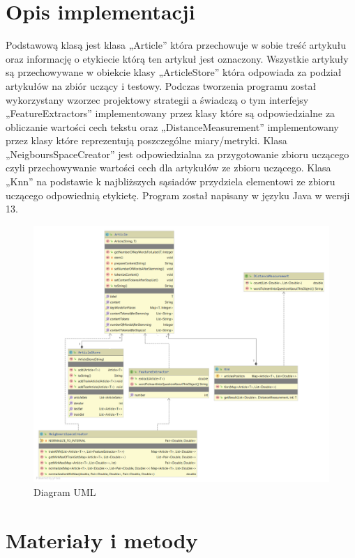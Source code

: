 \documentclass{classrep}
\begin{document}
\section{Opis implementacji}
{
Podstawową klasą jest klasa „Article” która przechowuje w sobie treść artykułu oraz informację o etykiecie którą ten artykuł jest oznaczony. Wszystkie artykuły są przechowywane w obiekcie klasy „ArticleStore” która odpowiada za podział artykułów na zbiór uczący i testowy. Podczas tworzenia programu został wykorzystany wzorzec projektowy strategii a świadczą o tym interfejsy „FeatureExtractors” implementowany przez klasy które są odpowiedzialne za obliczanie wartości cech tekstu oraz „DistanceMeasurement” implementowany przez klasy które reprezentują poszczególne miary/metryki. Klasa „NeigboursSpaceCreator” jest odpowiedzialna za przygotowanie zbioru uczącego czyli przechowywanie wartości cech dla artykułów ze zbioru uczącego. Klasa „Knn” na podstawie k najbliższych sąsiadów przydziela elementowi ze zbioru uczącego odpowiednią etykietę.
Program został napisany w języku Java w wersji 13.

\begin{figure}[H]
\caption{Diagram UML}
\centering
\includegraphics[width=1\textwidth]{uml}
\end{figure}
 }

\section{Materiały i metody}
\end{document}

